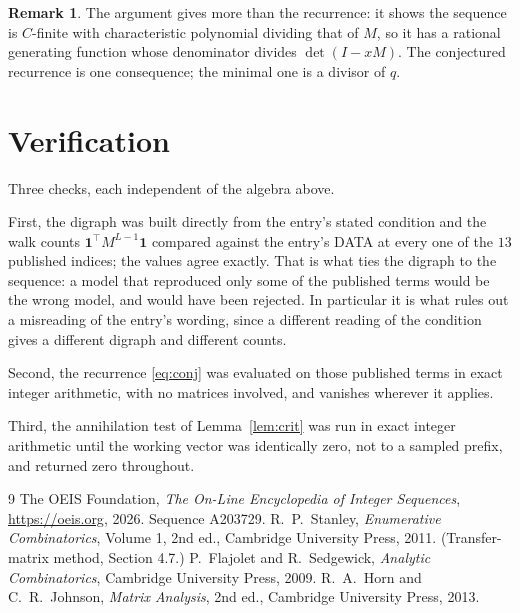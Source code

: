 \documentclass[11pt,a4paper]{article}
\theoremstyle{plain}
\theoremstyle{definition}
\newtheorem{remark}[theorem]{Remark}
\begin{document}
\begin{remark}
The argument gives more than the recurrence: it shows the sequence is $C$-finite with
characteristic polynomial dividing that of $M$, so it has a rational generating function
whose denominator divides $\det(I-xM)$. The conjectured recurrence is one consequence; the
minimal one is a divisor of $q$.
\end{remark}

\section{Verification}

Three checks, each independent of the algebra above.

First, the digraph was built directly from the entry's stated condition and the walk counts
$\mathbf{1}^{\!\top}M^{L-1}\mathbf{1}$ compared against the entry's DATA at
every one of the $13$ published indices; the values agree exactly. That is what ties
the digraph to the sequence: a model that reproduced only some of the published terms would
be the wrong model, and would have been rejected. In particular it is what rules out a
misreading of the entry's wording, since a different reading of the condition gives a
different digraph and different counts.

Second, the recurrence \eqref{eq:conj} was evaluated on those published terms in exact
integer arithmetic, with no matrices involved, and vanishes wherever it applies.

Third, the annihilation test of Lemma~\ref{lem:crit} was run in exact integer arithmetic
until the working vector was identically zero, not to a sampled prefix, and returned zero
throughout.

\begin{thebibliography}{9}
 The OEIS Foundation, \emph{The On-Line Encyclopedia of Integer
Sequences}, \url{https://oeis.org}, 2026. Sequence A203729.
 R.~P.~Stanley, \emph{Enumerative Combinatorics}, Volume 1, 2nd ed.,
Cambridge University Press, 2011. (Transfer-matrix method, Section 4.7.)
 P.~Flajolet and R.~Sedgewick, \emph{Analytic Combinatorics}, Cambridge
University Press, 2009.
 R.~A.~Horn and C.~R.~Johnson, \emph{Matrix Analysis}, 2nd ed., Cambridge
University Press, 2013.
\end{thebibliography}
\end{document}
